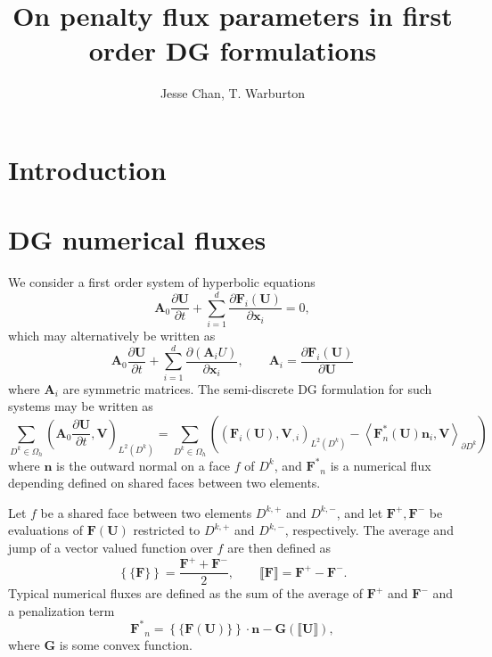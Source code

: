 \documentclass[10pt]{article}
\date{}
\author{Jesse Chan, T. Warburton}
\title{On penalty flux parameters in first order DG formulations}
\newcommand{\pd}[2]{\frac{\partial#1}{\partial#2}}
\newcommand{\LRp}[1]{\left( #1 \right)}
\newcommand{\LRa}[1]{\left\langle #1 \right\rangle}
\newcommand{\LRc}[1]{\left\{ #1 \right\}}
\newcommand{\jump}[1] {\ensuremath{\llbracket#1\rrbracket}}
\newcommand{\avg}[1] {\ensuremath{\LRc{\!\{#1\}\!}}}
\newcommand{\Lk}{L^2\LRp{D^k}}
\newcommand{\Oh}{\Omega_h}
\begin{document}
\maketitle
\tableofcontents

%

\section{Introduction}

\section{DG numerical  fluxes}

We consider a first order system of hyperbolic equations
\[
\bm{A}_0\pd{\bm{U}}{t} + \sum_{i=1}^d \pd{\bm{F}_i(\bm{U})}{\bm{x}_i} = 0,
\]
which may alternatively be written as
\[
\bm{A}_0\pd{\bm{U}}{t} + \sum_{i=1}^d \pd{\LRp{\bm{A}_{i}U}}{\bm{x}_i}, \qquad \bm{A}_{i} = \pd{\bm{F}_i(\bm{U})}{\bm{U}}
\]
where $\bm{A}_{i}$ are symmetric matrices.  The semi-discrete DG formulation for such systems may be written as 
\[
\sum_{D^k \in \Oh} \LRp{\bm{A}_0\pd{\bm{U}}{t},\bm{V} }_{\Lk} = \sum_{D^k \in \Oh}\LRp{ \LRp{\bm{F}_i(\bm{U}), \bm{V}_{,i}}_{\Lk} - \LRa{\bm{F}_n^*(\bm{U})\bm{n}_i,\bm{V}}_{\partial D^k}}
\]
where $\bm{n}$ is the outward normal on a face $f$ of $D^k$, and $\bm{F^*}_n$ is a numerical flux depending defined on shared faces between two elements.  


Let $f$ be a shared face between two elements $D^{k,+}$ and $D^{k,-}$, and let $\bm{F}^+, \bm{F}^-$ be evaluations of $\bm{F}(\bm{U})$ restricted to $D^{k,+}$ and $D^{k,-}$, respectively.  The average and jump of a vector valued function over $f$ are then defined as
\[
\avg{\bm{F}} = \frac{\bm{F}^+ + \bm{F}^-}{2}, \qquad \jump{\bm{F}} = \bm{F}^+ - \bm{F}^-.
\]
Typical numerical fluxes are defined as the sum of the average of $\bm{F}^+$ and $\bm{F}^-$ and a penalization term
\begin{equation}
\bm{F^*}_n = \avg{\bm{F}(\bm{U})}\cdot \bm{n} - \bm{G}\LRp{\jump{\bm{U}}},
\label{eq:flux}
\end{equation}
where $\bm{G}$ is some convex function.  
\end{document}
